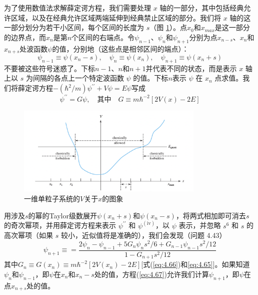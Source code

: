     为了使用数值法求解薛定谔方程，我们需要处理 $x$ 轴的一部分，其中包括经典允许区域，以及在经典允许区域两端延伸到经典禁止区域的部分。我们将 $x$ 轴的这一部分划分为若干小区间，每个区间的长度为 $s$（图 \ref{fig:4.7}）。点$x_0$和$x_{max}$是这一部分的边界点，而$x_n$是第$n$个区间的右端点。令$\psi_{n-1}$、$\psi_n$和$\psi_{n+1}$分别为点$x_{n-s}$、$x_n$和$x_{n+s}$处波函数$\psi$的值，分别地（这些点是相邻区间的端点）：
    \begin{equation}
        \psi_{n-1} \equiv \psi\left(x_n-s\right), \quad \psi_n \equiv \psi\left(x_n\right), \quad \psi_{n+1} \equiv \psi\left(x_n+s\right)
        \label{eq:4.65}
    \end{equation}
    不要被这些符号迷惑了。下标$n-1$、$n$和$n+1$并代表不同的状态，而是表示 $x$ 轴上以 $s$ 为间隔的各点上一个特定波函数 $\psi$ 的值。下标$n$表示 $\psi$ 在 $x_n$ 点求值。我们将薛定谔方程$-\left(\hbar^2/m\right)\psi^{\prime\prime} + V\psi = E\psi$写成
    \begin{equation}
        \psi^{\prime\prime} = G\psi, \quad \text{其中} \quad G \equiv m\hbar^{-2}\left[2V\left(x\right)-2E\right]
        \label{eq:4.66}
    \end{equation}
    \begin{figure}[h!]
        \centering
        \includegraphics[width=0.8\textwidth]{figures/4.7.png}
        \caption{一维单粒子系统的$V$关于$x$的图象}
        \label{fig:4.7}
    \end{figure}
    
    用涉及$s$的幂的Taylor级数展开$\psi\left(x_n+s\right)$和$\psi\left(x_n-s\right)$，将两式相加即可消去$s$的奇次幂项，并用薛定谔方程来表示 $\psi^{\prime\prime}$ 和 $\psi^{\left(\mathrm{iv}\right)}$，以 $\psi$ 表示，并忽略 $s^6$ 和 $s$ 的高次幂项（如果 $s$ 较小，近似值将是准确的），我们会发现（问题 4.43）
    \begin{equation}
        \psi_{n+1} \equiv = \frac{
            2\psi_n - \psi_{n-1} + 5G_n\psi_n s^2/6 + G_{n-1}\psi_{n-1}s^2/12
        }{
            1-G_{n+1}s^2/12
        }
        \label{eq:4.67}
    \end{equation}
    其中$G_n \equiv G\left(x_n\right) \equiv m\hbar^{-2}\left[2V\left(x_n\right)-2E\right]$[式(\ref{eq:4.66})和\ref{eq:4.65}]。如果知道$\psi_n$和$\psi_{n-1}$，即$\psi$在$x_n$和$x_n-s$处的值，方程(\ref{eq:4.67})允许我们计算$\psi_{n+1}$，即$\psi$在点$x_{n+s}$处的值。

